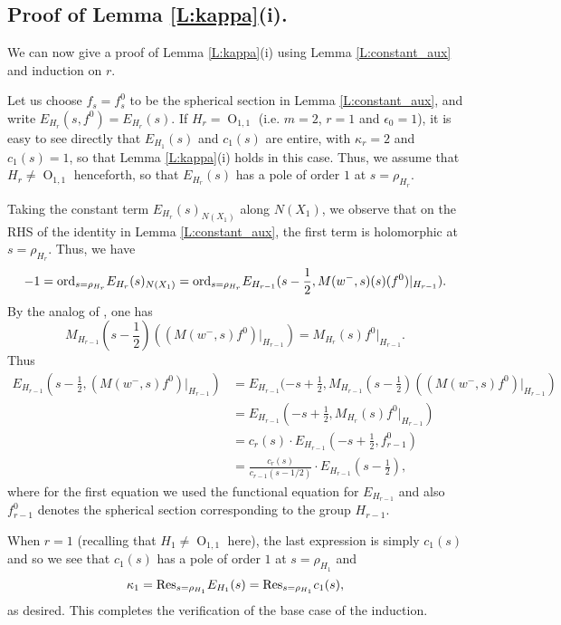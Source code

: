 \documentclass[10pt]{amsart}
\theoremstyle{plain}
\numberwithin{equation}{section}
\begin{document}
 \vskip 5pt
 
 \subsection{\bf Proof of Lemma \ref{L:kappa}(i).} \label{SS:kappa}
 We can now give a proof of Lemma \ref{L:kappa}(i) using Lemma
 \ref{L:constant_aux} and induction on $r$. 
 \vskip 5pt
 
 Let us choose $f_s=f_s^0$ to be the spherical section
 in Lemma \ref{L:constant_aux}, and write $E_{H_r}(s, f^0)=E_{H_r}(s)$. 
 If $H_r = {\operatorname{O}}_{1,1}$ (i.e. $m=2$, $r=1$ and $\epsilon_0=1$), it is easy to see directly that 
 $E_{H_1}(s)$ and $c_1(s)$ are entire, with $\kappa_r =2$ and $c_1(s) =1$, so that Lemma \ref{L:kappa}(i) holds in this case.  Thus, we assume that $H_r \ne {\operatorname{O}}_{1,1}$ henceforth, so that $E_{H_r}(s)$ has a pole of order $1$ at $s = \rho_{H_r}$.
  \vskip 5pt
 
 Taking
 the constant term $E_{H_r}(s)_{N(X_1)}$ along $N(X_1)$,  
 we observe that on the RHS of the identity in Lemma \ref{L:constant_aux}, the first term is holomorphic at $s = \rho_{H_r}$. Thus, we have
 \[  -1 = {\rm ord}_{s = \rho_{H_r}} E_{H_r}(s)_{N(X_1)} =  {\rm ord}_{s= \rho_{H_r}} E_{H_{r-1}}(s-\frac{1}{2},  M(w^-,s)(s)(f^0)|_{H_{r-1}}). \]
 By the analog of  \cite[Lemma 1.2.2]{KR3}, one has
\[  
M_{H_{r-1}}(s - \frac{1}{2}) \left( (M(w^-, s) f^0)|_{H_{r-1}}\right)   
= M_{H_r}(s) f^0 |_{H_{r-1}}. \]
Thus 
  \begin{align*}
   E_{H_{r-1}}(s - \frac{1}{2}, (M(w^-, s) f^0)|_{H_{r-1}})   
   &= E_{H_{r-1}}(-s + \frac{1}{2}, M_{H_{r-1}}(s - \frac{1}{2})
   \left( ( M(w^-, s) f^0)|_{H_{r-1}}\right)\\
   &=E_{H_{r-1}}(-s+ \frac{1}{2},  M_{H_r}(s) f^0 |_{H_{r-1}} )\\
   &= c_r(s) \cdot E_{H_{r-1}}(-s + \frac{1}{2}, f_{r-1}^0)\\
   &= \frac{c_r(s)}{c_{r-1}(s- 1/2)} \cdot E_{H_{r-1}}(s - \frac{1}{2}),
   \end{align*}
where for the first equation we used the functional equation for
$E_{H_{r-1}}$ and also $f_{r-1}^0$ denotes the spherical section
corresponding to the group $H_{r-1}$. 
\vskip 5pt

When $r = 1$  (recalling that $H_1 \ne {\operatorname{O}}_{1,1}$ here), the last
expression is simply $c_1(s)$ and so we see that $c_1(s)$ has a pole
of order $1$ at $s = \rho_{H_1}$ and
\[  \kappa_1 = {\rm Res}_{s = \rho_{H_1}} E_{H_1}(s) = {\rm Res}_{s = \rho_{H_1}}c_1(s), \]
as desired. This completes the verification of the base case of the induction. 
  \vskip 5pt
  
\end{document}
